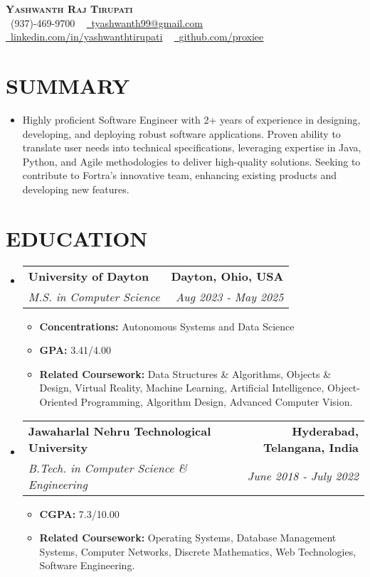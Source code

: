 \documentclass[letterpaper,11pt]{article}
\makeatletter
\newcommand{\resumeItem}[1]{\item\small{{#1 \vspace{-3pt}}}}
\newcommand{\resumeSubheading}[4]{\vspace{-2pt}\item\begin{tabular*}{0.97\textwidth}[t]{l@{\extracolsep{\fill}}r}\textbf{#1} & #2 \\\textit{\small#3} & \textit{\small #4} \\\end{tabular*}\vspace{-7pt}}
\newcommand{\resumeSubHeadingListStart}{\begin{itemize}[leftmargin=0.15in, label={}]}
\newcommand{\resumeSubHeadingListEnd}{\end{itemize}}
\newcommand{\resumeItemListStart}{\begin{itemize}}
\newcommand{\resumeItemListEnd}{\end{itemize}\vspace{-5pt}}
\makeatother
\begin{document}
\begin{center}
    \textbf{\Huge \scshape {\fontsize{15pt}{20pt}\selectfont Yashwanth Raj Tirupati}} \\ \vspace{1pt}
    \small \raisebox{-0.1\height}\faPhone\ (937)-469-9700 ~ \href{mailto:tyashwanth99@gmail.com}{\raisebox{-0.2\height}\faEnvelope\  \underline{tyashwanth99@gmail.com}} ~ 
    \href{https://linkedin.com/in/yashwanthtirupati}{\raisebox{-0.2\height}\faLinkedin\ \underline{linkedin.com/in/yashwanthtirupati}} ~ 
    \href{https://github.com/proxiee}{\raisebox{-0.2\height}\faGithub\ \underline{github.com/proxiee}}
    \vspace{-8pt}
\end{center}


\section{{\fontsize{9pt}{20pt}\selectfont \textbf{SUMMARY}}}
\resumeSubHeadingListStart

\resumeItem{Highly proficient Software Engineer with 2+ years of experience in designing, developing, and deploying robust software applications.  Proven ability to translate user needs into technical specifications, leveraging expertise in Java, Python, and Agile methodologies to deliver high-quality solutions.  Seeking to contribute to Fortra's innovative team, enhancing existing products and developing new features.}
\resumeSubHeadingListEnd
\vspace{-18pt}

\section{{\fontsize{9pt}{20pt}\selectfont \textbf{EDUCATION}}}
\resumeSubHeadingListStart
\resumeSubheading{University of Dayton}{\textbf{Dayton, Ohio, USA}}{M.S. in Computer Science}{Aug 2023 - May 2025}
\resumeItemListStart
\resumeItem{\textbf{Concentrations:} Autonomous Systems and Data Science}
\resumeItem{\textbf{GPA:} 3.41/4.00}
\resumeItem{\textbf{Related Coursework:} Data Structures \& Algorithms, Objects \& Design, Virtual Reality, Machine Learning, Artificial Intelligence, Object-Oriented Programming, Algorithm Design, Advanced Computer Vision.}
\resumeItemListEnd
\resumeSubheading{Jawaharlal Nehru Technological University}{\textbf{Hyderabad, Telangana, India}}{B.Tech. in Computer Science \& Engineering}{June 2018 - July 2022}
\resumeItemListStart
\resumeItem{\textbf{CGPA:} 7.3/10.00}
\resumeItem{\textbf{Related Coursework:} Operating Systems, Database Management Systems, Computer Networks, Discrete Mathematics, Web Technologies, Software Engineering.}
\resumeItemListEnd
\resumeSubHeadingListEnd
\vspace{-18pt}
\end{document}
